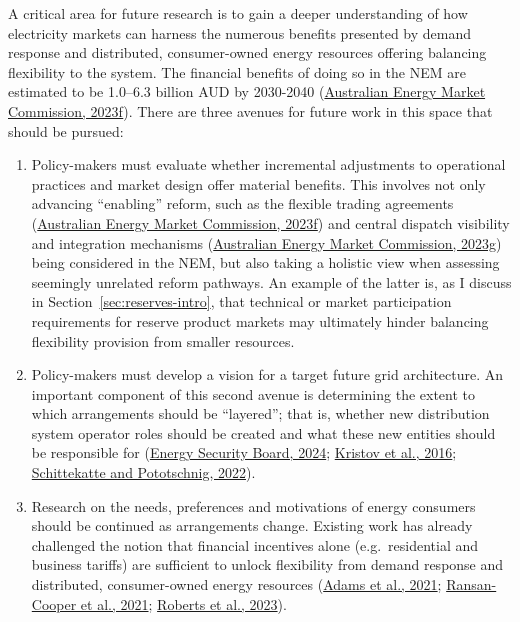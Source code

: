 \documentclass[12pt,a4paper,]{report}
\begin{document}
A critical area for future research is to gain a deeper understanding of
how electricity markets can harness the numerous benefits presented by
demand response and distributed, consumer-owned energy resources
offering balancing flexibility to the system. The financial benefits of
doing so in the NEM are estimated to be 1.0--6.3 billion AUD by
2030-2040
(\protect\hyperlink{ref-australianenergymarketcommissionUnlockingCERBenefits2023}{Australian
Energy Market Commission, 2023f}). There are three avenues for future
work in this space that should be pursued:

\begin{enumerate}
\def\labelenumi{\arabic{enumi}.}
\item
  Policy-makers must evaluate whether incremental adjustments to
  operational practices and market design offer material benefits. This
  involves not only advancing ``enabling'' reform, such as the flexible
  trading agreements
  (\protect\hyperlink{ref-australianenergymarketcommissionUnlockingCERBenefits2023}{Australian
  Energy Market Commission, 2023f}) and central dispatch visibility and
  integration mechanisms
  (\protect\hyperlink{ref-australianenergymarketcommissionIntegratingPriceresponsiveResources2023a}{Australian
  Energy Market Commission, 2023g}) being considered in the NEM, but
  also taking a holistic view when assessing seemingly unrelated reform
  pathways. An example of the latter is, as I discuss in
  Section~\ref{sec:reserves-intro}, that technical or market
  participation requirements for reserve product markets may ultimately
  hinder balancing flexibility provision from smaller resources.
\item
  Policy-makers must develop a vision for a target future grid
  architecture. An important component of this second avenue is
  determining the extent to which arrangements should be ``layered'';
  that is, whether new distribution system operator roles should be
  created and what these new entities should be responsible for
  (\protect\hyperlink{ref-energysecurityboardConsumerEnergyResources2024}{Energy
  Security Board, 2024};
  \protect\hyperlink{ref-kristovTaleTwoVisions2016}{Kristov et al.,
  2016};
  \protect\hyperlink{ref-schittekatteDistributedEnergyResources2022}{Schittekatte
  and Pototschnig, 2022}).
\item
  Research on the needs, preferences and motivations of energy consumers
  should be continued as arrangements change. Existing work has already
  challenged the notion that financial incentives alone
  (e.g.~residential and business tariffs) are sufficient to unlock
  flexibility from demand response and distributed, consumer-owned
  energy resources
  (\protect\hyperlink{ref-adamsSocialLicenseAutomate2021}{Adams et al.,
  2021};
  \protect\hyperlink{ref-ransan-cooperApplyingResponsibleAlgorithm2021}{Ransan-Cooper
  et al., 2021};
  \protect\hyperlink{ref-robertsSocialLicenseAutomate2023}{Roberts et
  al., 2023}).
\end{enumerate}
\end{document}
